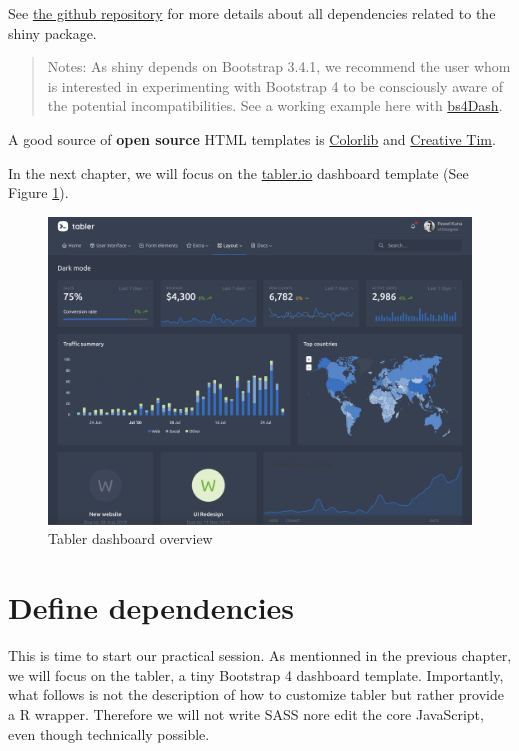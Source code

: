 \documentclass[]{book}
\begin{document}
See \href{https://github.com/rstudio/shiny/tree/master/inst/www/shared}{the github repository} for more details about all dependencies related to the shiny package.

\begin{quote}
Notes: As shiny depends on Bootstrap 3.4.1, we recommend the user whom is interested in experimenting with Bootstrap 4 to be consciously aware of the potential incompatibilities. See a working example here with \href{https://github.com/RinteRface/bs4Dash}{bs4Dash}.
\end{quote}

A good source of \textbf{open source} HTML templates is \href{https://colorlib.com}{Colorlib} and \href{https://www.creative-tim.com/bootstrap-themes/free}{Creative Tim}.

In the next chapter, we will focus on the \href{https://preview-dev.tabler.io/layout-dark.html}{tabler.io} dashboard template (See Figure \ref{fig:tabler-dark}).

\begin{figure}
\includegraphics[width=34.33in]{images/practice/tabler-dark} \caption{Tabler dashboard overview}\label{fig:tabler-dark}
\end{figure}

\hypertarget{custom-templates-dependencies}{%
\chapter{Define dependencies}\label{custom-templates-dependencies}}

This is time to start our practical session. As mentionned in the previous chapter, we will focus on the tabler, a tiny Bootstrap 4 dashboard template.
Importantly, what follows is not the description of how to customize tabler but rather provide a R wrapper. Therefore we will not write SASS nore edit the core JavaScript, even though technically possible.
\end{document}
